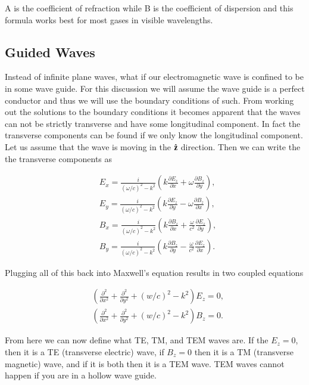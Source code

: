 \documentclass[preprint, review,12pt]{elsarticle}
\def\b{\textbf}
\def\9{\left(}
\def\0{\right)}
\newcommand{\pd}[2]{\frac{\partial #1 }{\partial #2}}
\newcommand{\pds}[2]{\frac{\partial^2 #1 }{\partial {#2}^2}}
\newcommand{\hb}[1]{\hat{\b #1}}
\begin{document}
A is the coefficient of refraction while B is the coefficient of dispersion and this formula works best for most gases in visible wavelengths.

\subsection{Guided Waves}

Instead of infinite plane waves, what if our electromagnetic wave is confined to be in some wave guide. For this discussion we will assume the wave guide is a perfect conductor and thus we will use the boundary conditions of such. From working out the solutions to the boundary conditions it becomes apparent that the waves can not be strictly transverse and have some longitudinal component. In fact the transverse components can be found if we only know the longitudinal component. Let us assume that the wave is moving in the $\hb z$ direction. Then we can write the the transverse components as 

\begin{equation}
\begin{split}
    & E_x = \frac{i}{(\omega/c)^2 - k^2} \9 k \pd{E_z}{x} + \omega \pd{B_z}{y} \0, \\
    & E_y = \frac{i}{(\omega/c)^2 - k^2} \9 k \pd{E_z}{y} - \omega \pd{B_z}{x} \0, \\
    & B_x = \frac{i}{(\omega/c)^2 - k^2} \9 k \pd{B_z}{x} + \frac{\omega}{c^2} \pd{E_z}{y} \0, \\
    & B_y = \frac{i}{(\omega/c)^2 - k^2} \9 k \pd{B_z}{y} - \frac{\omega}{c^2} \pd{E_z}{x} \0.
\end{split}
\end{equation}

Plugging all of this back into Maxwell's equation results in two coupled equations

\begin{equation}
\begin{split}
    & \9 \pds{}{x} + \pds{}{y} + (w/c)^2 - k^2 \0 E_z = 0, \\
    & \9 \pds{}{x} + \pds{}{y} + (w/c)^2 - k^2 \0 B_z = 0.
\end{split}
\end{equation}

From here we can now define what TE, TM, and TEM waves are. If the $E_z = 0$, then it is a TE (transverse electric) wave, if $B_z = 0$ then it is a TM (transverse magnetic) wave, and if it is both then it is a TEM wave. TEM waves cannot happen if you are in a hollow wave guide. 
\end{document}
